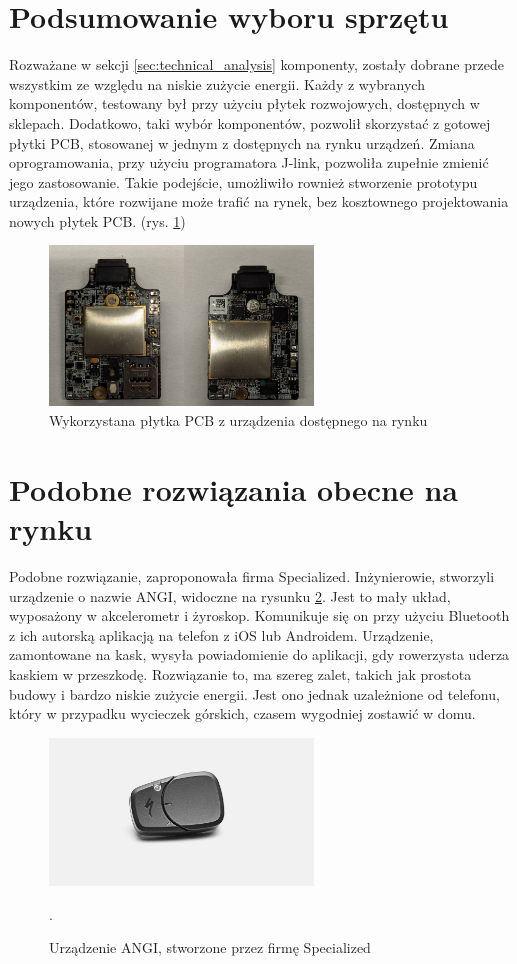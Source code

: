\section{Podsumowanie wyboru sprzętu}
Rozważane w sekcji \ref{sec:technical_analysis} komponenty, zostały dobrane przede wszystkim ze względu na niskie zużycie energii. Każdy z wybranych komponentów, testowany był przy użyciu płytek rozwojowych, dostępnych w sklepach. Dodatkowo, taki wybór komponentów, pozwolił skorzystać z gotowej płytki PCB, stosowanej w jednym z dostępnych na rynku urządzeń. Zmiana oprogramowania, przy użyciu programatora J-link, pozwoliła zupełnie zmienić jego zastosowanie. Takie podejście, umożliwiło rownież stworzenie prototypu urządzenia, które rozwijane może trafić na rynek, bez kosztownego projektowania nowych płytek PCB. (rys. \ref{img:pcb})
\begin{figure}[t]
    \centering
    \includegraphics[width=7cm]{Graphics/PCB.png}
    \caption{Wykorzystana płytka PCB z urządzenia dostępnego na rynku}
    \label{img:pcb}
\end{figure}
\section{Podobne rozwiązania obecne na rynku}
Podobne rozwiązanie, zaproponowała firma Specialized. Inżynierowie, stworzyli urządzenie o nazwie ANGI, widoczne na rysunku \ref{img:angi_img}. Jest to mały układ, wyposażony w akcelerometr i żyroskop. Komunikuje się on przy użyciu Bluetooth z ich autorską aplikacją na telefon z iOS lub Androidem. Urządzenie, zamontowane na kask, wysyła powiadomienie do aplikacji, gdy rowerzysta uderza kaskiem w przeszkodę. Rozwiązanie to, ma szereg zalet, takich jak prostota budowy i bardzo niskie zużycie energii. Jest ono jednak uzależnione od telefonu, który w przypadku wycieczek górskich, czasem wygodniej zostawić w domu.
\begin{figure}[h]
\includegraphics[width=7cm]{Graphics/angi.png}
\centering
\caption{Urządzenie ANGI, stworzone przez firmę Specialized \cite{ANGI}}.
\centering
\label{img:angi_img}
\end{figure}















